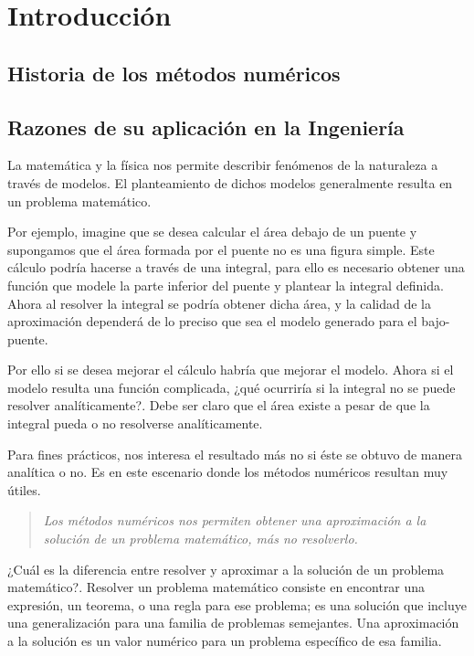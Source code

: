 \chapter{Introducción}


\section{Historia de los métodos numéricos}

\section{Razones de su aplicación en la Ingeniería}
La matemática y la física nos permite describir fenómenos de la naturaleza a través de modelos. El planteamiento de dichos modelos
generalmente resulta en un problema matemático. 

Por ejemplo, imagine que se desea calcular el área debajo de un puente y supongamos que el área formada por el puente no es una figura simple. 
Este cálculo podría hacerse a través de una integral, para ello es necesario obtener una función que modele la parte inferior del puente y plantear
la integral definida. Ahora al resolver la integral se podría obtener dicha área, y la calidad de la aproximación dependerá de lo preciso que sea
el modelo generado para el bajo-puente.

Por ello si se desea mejorar el cálculo habría que mejorar el modelo. Ahora si el modelo resulta una función complicada, ¿qué ocurriría si la integral
no se puede resolver analíticamente?. Debe ser claro que el área existe a pesar de que la integral pueda o no resolverse analíticamente. 

Para fines prácticos, nos interesa el resultado más no si éste se obtuvo de manera analítica o no. Es en este escenario donde los métodos numéricos
resultan muy útiles. 

\begin{verse}
\textit{Los métodos numéricos nos permiten obtener una aproximación a la solución de un problema matemático, más no resolverlo.} 
\end{verse}

¿Cuál es la diferencia entre resolver y aproximar a la solución de un problema matemático?. Resolver un problema matemático consiste en encontrar
una expresión, un teorema, o una regla para ese problema; es una solución que incluye una generalización para una familia de problemas semejantes.
Una aproximación a la solución es un valor numérico para un problema específico de esa familia.

